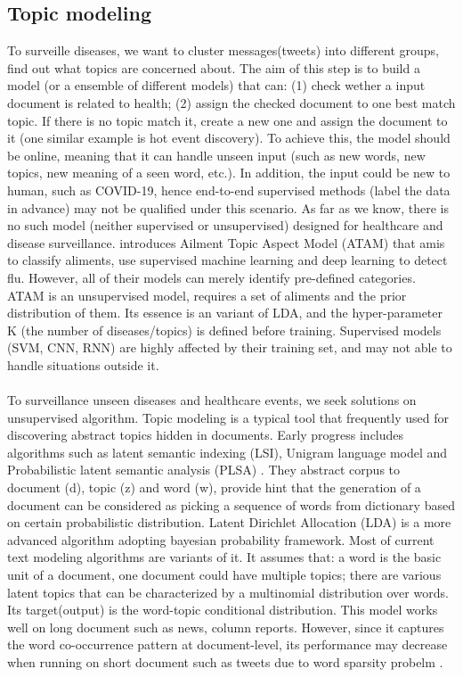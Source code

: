 \subsection{Topic modeling}
\label{sec:topic modeling}
To surveille diseases, we want to cluster messages(tweets) into different groups, find out what topics are concerned about. The aim of this step is to build a model (or a ensemble of different models) that can: (1) check wether a input document is related to health; (2) assign the checked document to one best match topic. If there is no topic match it, create a new one and assign the document to it (one similar example is hot event discovery). To achieve this, the model should be online, meaning that it can handle unseen input (such as new words, new topics, new meaning of a seen word, etc.). In addition, the input could be new to human, such as COVID-19, hence end-to-end supervised methods (label the data in advance) may not be qualified under this scenario. As far as we know, there is no such model (neither supervised or unsupervised) designed for healthcare and disease surveillance. \cite{paul2012model} introduces Ailment Topic Aspect Model (ATAM) that amis to classify aliments, \cite{serban2019real,aramaki2011twitter,lampos2010flu,chen2017disease} use supervised machine learning and deep learning to detect flu. However, all of their models can merely identify pre-defined categories. ATAM is an unsupervised model, requires a set of aliments and the prior distribution of them. Its essence is an variant of LDA, and the hyper-parameter K (the number of diseases/topics) is defined before training. Supervised models (SVM, CNN, RNN) are highly affected by their training set, and may not able to handle situations outside it.\\\\
To surveillance unseen diseases and healthcare events, we seek solutions on unsupervised algorithm. Topic modeling is a typical tool that frequently used for discovering abstract topics hidden in documents. Early progress includes algorithms such as latent semantic indexing (LSI), Unigram language model and Probabilistic latent semantic analysis (PLSA) \cite{hofmann1999probabilistic, baeza1999modern}. They abstract corpus to document (d), topic (z) and word (w), provide hint that the generation of a document can be considered as picking a sequence of words from dictionary based on certain probabilistic distribution. Latent Dirichlet Allocation (LDA) \cite{blei2003latent} is a more advanced algorithm adopting bayesian probability framework. Most of current text modeling algorithms are variants of it. It assumes that: a word is the basic unit of a document, one document could have multiple topics; there are various latent topics that can be characterized by a multinomial distribution over words. Its target(output) is the word-topic conditional distribution. This model works well on long document such as news, column reports. However, since it captures the word co-occurrence pattern at document-level, its performance may decrease when running on short document such as tweets due to word sparsity probelm \cite{yan2013biterm}. \\\\
